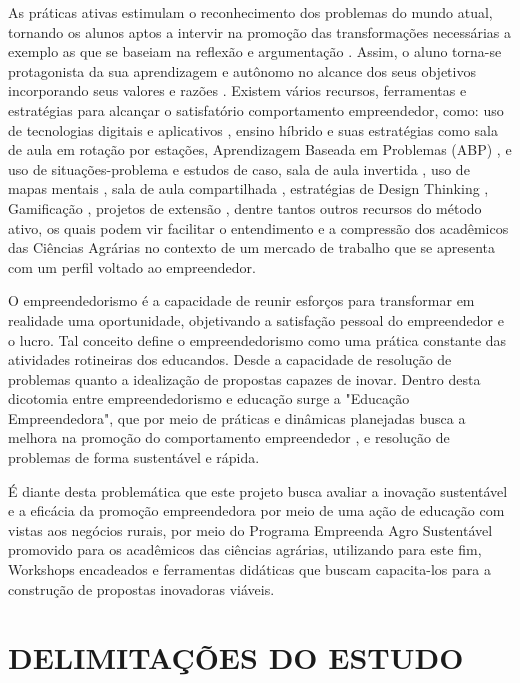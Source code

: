 As práticas ativas estimulam o reconhecimento dos problemas do mundo atual, tornando os alunos aptos a intervir na promoção das transformações necessárias a exemplo as que se baseiam  na reflexão e argumentação \cite{bezanilla_methodologies_2019}. Assim, o aluno torna-se protagonista da sua aprendizagem e autônomo no alcance dos seus objetivos incorporando seus valores e razões \cite{rubel_student_2016}. Existem vários recursos, ferramentas e estratégias para alcançar o satisfatório comportamento empreendedor, como: uso de tecnologias digitais e aplicativos \cite{pereira_use_2020}, ensino híbrido e suas estratégias como sala de aula em rotação por estações, Aprendizagem Baseada em Problemas (ABP) \cite{souza_aprendizagem_2015}, e uso de situações-problema e estudos de caso, sala de aula invertida \cite{junior_sala_2016,branco_sala_2016}, uso de mapas mentais \cite{junior_percepcao_2018}, sala de aula compartilhada \cite{strack_por_2009}, estratégias de Design Thinking \cite{andrews_circular_2015}, Gamificação \cite{ogawa_avaliacao_2016}, projetos de extensão \cite{garcia_contribuicao_2012}, dentre tantos outros recursos do método ativo, os quais podem vir facilitar o entendimento e a compressão dos acadêmicos das Ciências Agrárias no contexto de um mercado de trabalho que se apresenta com um perfil voltado ao empreendedor.

O empreendedorismo é a capacidade de reunir esforços para transformar em realidade uma oportunidade, objetivando a satisfação pessoal do empreendedor e o lucro. Tal conceito define o empreendedorismo como uma prática constante das atividades rotineiras dos educandos. Desde a capacidade de resolução de problemas quanto a idealização de propostas capazes de inovar. Dentro desta dicotomia entre empreendedorismo e educação surge a "Educação Empreendedora", que por meio de práticas e dinâmicas planejadas busca a melhora na promoção do comportamento empreendedor \cite{martins_educacao_2016, morais_empreendedorismo_2018}, e resolução de problemas de forma sustentável e rápida.

É diante desta problemática que este projeto busca avaliar a inovação sustentável e a eficácia da promoção empreendedora por meio de uma ação de educação com vistas aos negócios rurais, por meio do Programa Empreenda Agro Sustentável promovido para os acadêmicos das ciências agrárias, utilizando para este fim, Workshops encadeados e ferramentas didáticas que buscam capacita-los para a construção de propostas inovadoras viáveis.


\section{DELIMITAÇÕES DO ESTUDO}

